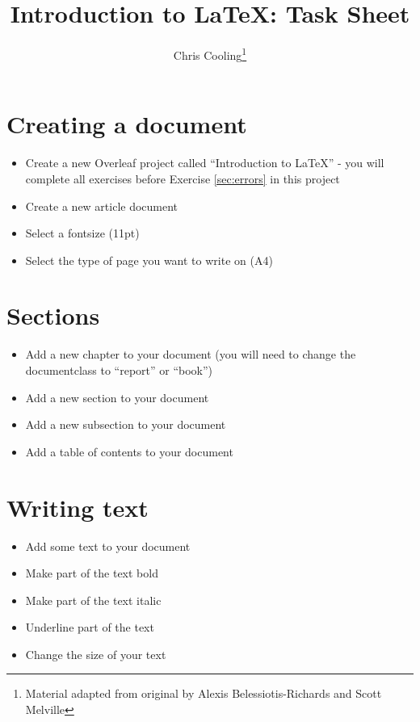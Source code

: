 \documentclass[11pt,a4paper]{article}
\begin{document}
\title{Introduction to \LaTeX: Task Sheet}
\author{Chris Cooling\thanks{Material adapted from original by Alexis Belessiotis-Richards and Scott Melville}}
\maketitle
\pagestyle{empty}
\thispagestyle{empty}

\section{Creating a document}
\begin{itemize}
\item Create a new Overleaf project called ``Introduction to LaTeX'' - you will complete all exercises before Exercise \ref{sec:errors} in this project
\item Create a new article document
\item Select a fontsize (11pt)
\item Select the type of page you want to write on (A4)
\end{itemize}

\section{Sections}
\begin{itemize}
\item Add a new chapter to your document (you will need to change the documentclass to ``report'' or ``book'')
\item Add a new section to your document
\item Add a new subsection to your document
\item Add a table of contents to your document
\end{itemize}

\section{Writing text}
\begin{itemize}
\item Add some text to your document
\item Make part of the text bold
\item Make part of the text italic
\item Underline part of the text
\item Change the size of your text
\end{itemize}
\end{document}
